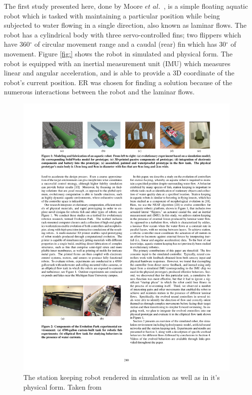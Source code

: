 \documentclass{sig-alternate}
\begin{document}
	The first study presented here, done by Moore $et$ $al.$~\cite{Moore:2013:ESK:2463372.2463402}, is a simple floating aquatic robot which is tasked with maintaining a particular position while being subjected to water flowing in a single direction, also known as laminar flows. The robot has a cylindrical body with three servo-controlled fins; two flippers which have 360$^\circ$ of circular movement range and a caudal (rear) fin which has 30$^\circ$ of movement. Figure \ref{fig:} shows the robot in simulated and physical form. The robot is equipped with an inertial measurement unit (IMU) which measures linear and angular acceleration, and is able to provide a 3D coordinate of the robot's current position. ER was chosen for finding a solution because of the numerous interactions between the robot and the laminar flows.

\begin{figure}%
\center
  \includegraphics[scale=.8]{sr2}
\caption{The station keeping robot rendered in simulation as well as in it's physical form. Taken from \cite{Moore:2013:ESK:2463372.2463402}}
\label{fig:sRobot}
\end{figure}
\end{document}
